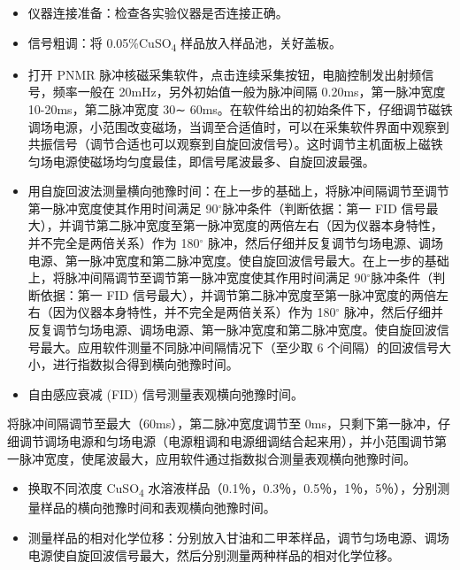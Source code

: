 \begin{itemize}
\item
  仪器连接准备：检查各实验仪器是否连接正确。
\item
  信号粗调：将 0.05\%CuSO\textsubscript{4} 样品放入样品池，关好盖板。
\item
  打开 PNMR 脉冲核磁采集软件，点击连续采集按钮，电脑控制发出射频信号，频率一般在
  20mHz，另外初始值一般为脉冲间隔 0.20ms，第一脉冲宽度
  10-20ms，第二脉冲宽度 30∼
  60ms。在软件给出的初始条件下，仔细调节磁铁调场电源，小范围改变磁场，当调至合适值时，可以在采集软件界面中观察到共振信号（调节合适也可以观察到自旋回波信号）。这时调节主机面板上磁铁匀场电源使磁场均匀度最佳，即信号尾波最多、自旋回波最强。
\item
  用自旋回波法测量横向弛豫时间：在上一步的基础上，将脉冲间隔调节至调节第一脉冲宽度使其作用时间满足
  90$^{\circ}$脉冲条件（判断依据：第一 FID
  信号最大），并调节第二脉冲宽度至第一脉冲宽度的两倍左右（因为仪器本身特性，并不完全是两倍关系）作为
  180$^{\circ}$
  脉冲，然后仔细并反复调节匀场电源、调场电源、第一脉冲宽度和第二脉冲宽度。使自旋回波信号最大。在上一步的基础上，将脉冲间隔调节至调节第一脉冲宽度使其作用时间满足
  90$^{\circ}$脉冲条件（判断依据：第一 FID
  信号最大），并调节第二脉冲宽度至第一脉冲宽度的两倍左右（因为仪器本身特性，并不完全是两倍关系）作为
  180$^{\circ}$
  脉冲，然后仔细并反复调节匀场电源、调场电源、第一脉冲宽度和第二脉冲宽度。使自旋回波信号最大。应用软件测量不同脉冲间隔情况下（至少取
  6 个间隔）的回波信号大小，进行指数拟合得到横向弛豫时间。
\item
  自由感应衰减 (FID) 信号测量表观横向弛豫时间。
\end{itemize}

将脉冲间隔调节至最大（60ms），第二脉冲宽度调节至
0ms，只剩下第一脉冲，仔细调节调场电源和匀场电源（电源粗调和电源细调结合起来用），并小范围调节第一脉冲宽度，使尾波最大，应用软件通过指数拟合测量表观横向弛豫时间。

\begin{itemize}
\item
  换取不同浓度 CuSO\textsubscript{4}
  水溶液样品（0.1％，0.3％，0.5％，1％，5％），分别测量样品的横向弛豫时间和表观横向弛豫时间。
\item
  测量样品的相对化学位移：分别放入甘油和二甲苯样品，调节匀场电源、调场电源使自旋回波信号最大，然后分别测量两种样品的相对化学位移。
\end{itemize}
